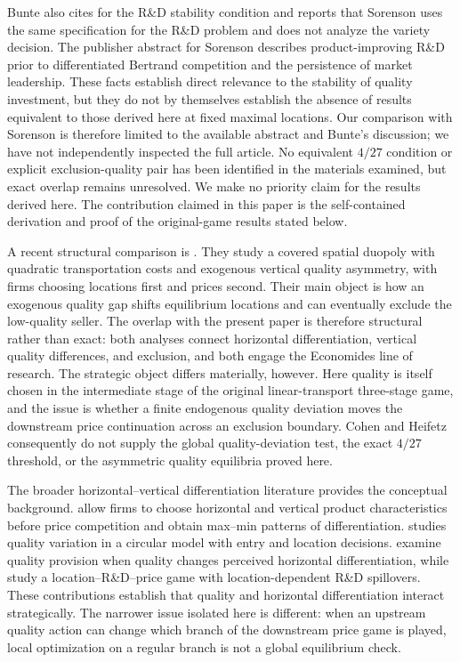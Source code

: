 Bunte also cites \citet{Sorenson1995} for the R\&D stability condition and reports that Sorenson uses the same specification for the R\&D problem and does not analyze the variety decision. The publisher abstract for Sorenson describes product-improving R\&D prior to differentiated Bertrand competition and the persistence of market leadership. These facts establish direct relevance to the stability of quality investment, but they do not by themselves establish the absence of results equivalent to those derived here at fixed maximal locations. Our comparison with Sorenson is therefore limited to the available abstract and Bunte's discussion; we have not independently inspected the full article. No equivalent $4/27$ condition or explicit exclusion-quality pair has been identified in the materials examined, but exact overlap remains unresolved. We make no priority claim for the results derived here. The contribution claimed in this paper is the self-contained derivation and proof of the original-game results stated below.

A recent structural comparison is \citet{CohenHeifetz2024}. They study a covered spatial duopoly with quadratic transportation costs and exogenous vertical quality asymmetry, with firms choosing locations first and prices second. Their main object is how an exogenous quality gap shifts equilibrium locations and can eventually exclude the low-quality seller. The overlap with the present paper is therefore structural rather than exact: both analyses connect horizontal differentiation, vertical quality differences, and exclusion, and both engage the Economides line of research. The strategic object differs materially, however. Here quality is itself chosen in the intermediate stage of the original linear-transport three-stage game, and the issue is whether a finite endogenous quality deviation moves the downstream price continuation across an exclusion boundary. Cohen and Heifetz consequently do not supply the global quality-deviation test, the exact $4/27$ threshold, or the asymmetric quality equilibria proved here.

The broader horizontal--vertical differentiation literature provides the conceptual background. \citet{NevenThisse1990} allow firms to choose horizontal and vertical product characteristics before price competition and obtain max--min patterns of differentiation. \citet{Economides1993} studies quality variation in a circular model with entry and location decisions. \citet{DegryseIrmen2001} examine quality provision when quality changes perceived horizontal differentiation, while \citet{PigaPoyagoTheotoky2005} study a location--R\&D--price game with location-dependent R\&D spillovers. These contributions establish that quality and horizontal differentiation interact strategically. The narrower issue isolated here is different: when an upstream quality action can change which branch of the downstream price game is played, local optimization on a regular branch is not a global equilibrium check.

